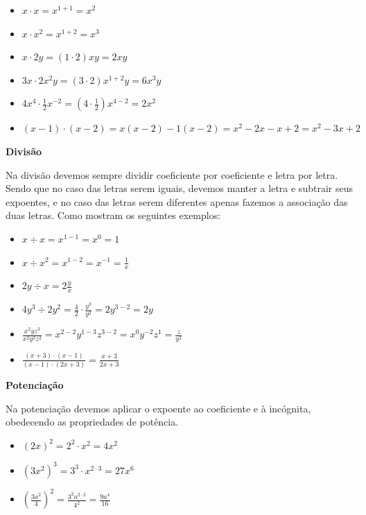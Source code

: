   \begin{itemize}
   \item $x \cdot x = x^{1+1}= x^2$
   \item $x \cdot x^2= x^{1+2}= x^3$
   \item $x \cdot 2y= (1 \cdot 2)xy= 2xy$
   \item $3x \cdot 2x^2y= (3 \cdot 2)x^{1+2}y= 6x^3y$
   \item $4x^4 \cdot \frac{1}{2}x^{-2}= (4 \cdot \frac{1}{2})x^{4-2}= 2x^2$
   \item $(x - 1) \cdot (x - 2)= x(x-2) - 1(x-2)= x^2 -2x -x +2= x^2 - 3x + 2$
  \end{itemize}

  \vskip0.3cm

   \textbf{Divisão}

   Na divisão devemos sempre dividir coeficiente por coeficiente e letra por letra. Sendo que no caso das letras serem iguais, devemos manter a letra e subtrair seus expoentes, e no caso das letras serem diferentes apenas fazemos a associação das duas letras. Como mostram os seguintes exemplos:

  \begin{itemize}
   \item $x \div x= x^{1-1}= x^0= 1$
   \item $x \div x^2= x^{1-2}= x^{-1}= \frac{1}{x}$
   \item $2y \div x= 2\frac{y}{x}$
   \item $4y^3 \div 2y^2= \frac{4}{2} \cdot \frac{y^3}{y^2}= 2y^{3-2}= 2y$
   \item $\frac{x^2yz^3}{x^2y^3z^2}= x^{2-2}y^{1-3}z^{3-2}= x^0 y^{-2}z^{1}= \frac{z}{y^2}$
   \item $\frac{(x+3) \cdot (x-1)}{(x-1)\cdot (2x+3)}= \frac{x+3}{2x+3}$
  \end{itemize}

 \vskip0.3cm

  \textbf{Potenciação}

  Na potenciação devemos aplicar o expoente ao coeficiente e à incógnita, obedecendo as propriedades de potência.

    \begin{itemize}
     \item $(2x)^2= 2^2 \cdot x^2= 4x^2$
     \item $(3x^2)^3= 3^3 \cdot x^{2\cdot 3}= 27x^6$
     \item $\left(\frac{3a^2}{4}\right)^2= \frac{3^2 a^{2 \cdot 2}}{4^2}= \frac{9a^4}{16}$
    \end{itemize}

